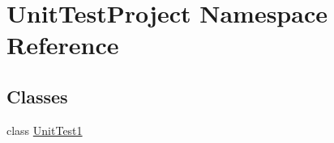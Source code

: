 \hypertarget{namespace_unit_test_project}{}\section{Unit\+Test\+Project Namespace Reference}
\label{namespace_unit_test_project}
\subsection*{Classes}
\begin{DoxyCompactItemize}
\item 
class \hyperlink{class_unit_test_project_1_1_unit_test1}{Unit\+Test1}
\end{DoxyCompactItemize}
